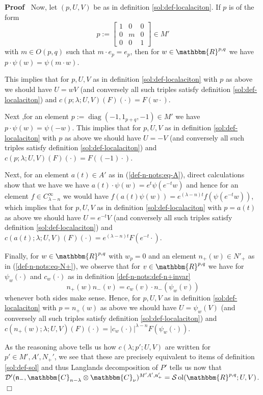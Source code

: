 \documentclass{article}
\newcommand{\assign}{:=}
\newcommand{\tmop}[1]{\ensuremath{\operatorname{#1}}}
\newenvironment{proof}{\noindent\textbf{Proof\ }}{\hspace*{\fill}$\Box$\medskip}
\numberwithin{definition}{section}
\numberwithin{lemma}{section}
\numberwithin{proposition}{section}
{\theorembodyfont{\rmfamily}\newtheorem{remark}{Remark}
\numberwithin{remark}{section}
}
\begin{document}
\begin{proof}
  Now, let $( p, U, V)$ be as in definition \ref{sol:def-localaciton}. If $p$
  is of the form
  \[ p \assign \left[ \begin{array}{ccc}
       1 & 0 & 0\\
       0 & m & 0\\
       0 & 0 & 1
     \end{array} \right] \in M' \]
  with $m \in O ( p, q)$ such that $m \cdot e_p = e_p$, then for $w \in
  \mathbbm{R}^{p, q}$ we have $p \cdot \psi ( w) = \psi ( m \cdot w)$.
  
  This implies that for $p, U, V$ as in definition \ref{sol:def-localaciton}
  with $p$ as above we should have $U = w V$ (and conversely all such triples
  satisfy definition \ref{sol:def-localaciton}) and $c ( p ; \lambda ; U, V) (
  F) ( \cdot) = F ( w \cdot)$.
  
  Next ,for an element $p \assign \tmop{diag} ( - 1, 1_{p + q}, - 1) \in M'$
  we have $p \cdot \psi ( w) = \psi ( - w)$. This implies that for $p, U, V$
  as in definition \ref{sol:def-localaciton} with $p$ as above we should have
  $U = - V$ (and conversely all such triples satisfy definition
  \ref{sol:def-localaciton}) and $c ( p ; \lambda ; U, V) ( F) ( \cdot) = F (
  ( - 1) \cdot)$.
  
  Next, for an element $a ( t) \in A'$ as in (\ref{def-n-nots:eq-A}), direct
  calculations show that we have we have $a ( t) \cdot \psi ( w) = e^t \psi (
  e^{- t} w)$ and hence for an element $f \in C^{\infty}_{\lambda - n}$ we
  would have $f ( a ( t) \psi ( w)) = e^{( \lambda - n) t} f ( \psi ( e^{- t}
  w))$, which implies that for $p, U, V$ as in definition
  \ref{sol:def-localaciton} with $p = a ( t)$ as above we should have $U =
  e^{- t} V$ (and conversely all such triples satisfy definition
  \ref{sol:def-localaciton}) and $c ( a ( t) ; \lambda ; U, V) ( F) ( \cdot) =
  e^{( \lambda - n) t} F ( e^{- t} \cdot)$.
  
  Finally, for $w \in \mathbbm{R}^{p, q}$ with $w_p = 0$ and an element $n_+ (
  w) \in N'_+$ as in (\ref{def-n-nots:eq-N+}), we observe that for $v \in
  \mathbbm{R}^{p, q}$ we have for $\psi_w ( \cdot)$ and $c_w ( \cdot)$ as in
  definition \ref{def-n-nots:def-n+invar}
  \[ n_+ ( w) n_- ( v) = c_w ( v) \cdot n_- ( \psi_w ( v)) \]
  whenever both sides make sense. Hence, for $p, U, V$ as in definition
  \ref{sol:def-localaciton} with $p = n_+ ( w)$ as above we should have $U =
  \psi_w ( V)$ (and conversely all such triples satisfy definition
  \ref{sol:def-localaciton}) and $c ( n_+ ( w) ; \lambda ; U, V) ( F) ( \cdot)
  = | c_w ( \cdot) |^{\lambda - n} F ( \psi_w ( \cdot))$.
  
  As the reasoning above tells us how $c ( \lambda ; p' ; U, V)$ are written
  for $p' \in M', A', N_+'$, we see that these are precisely equivalent to
  items of definition \ref{sol:def-sol} and thus Langlands decomposition of
  $P'$ tells us now that $\mathcal{D}' ( \mathfrak{n}_-, \mathbbm{C}_{n -
  \lambda} \otimes \mathbbm{C}_{\nu})^{M' A', \mathfrak{n}'_+} =\mathcal{S}
  \tmop{ol} ( \mathbbm{R}^{p, q} ; U, V)$.
\end{proof}
\end{document}
